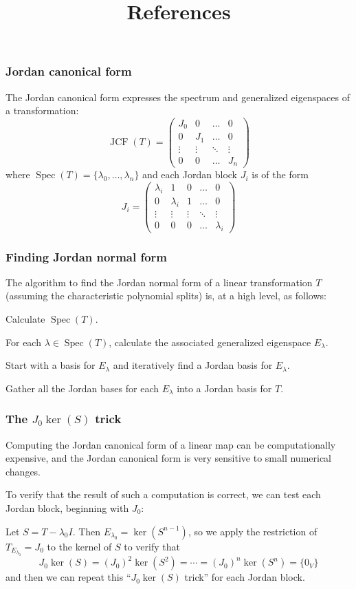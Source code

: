 \documentclass{beamer}
\DeclareMathOperator{\Spec}{Spec}
\theoremstyle{definition}
\begin{document}
\begin{frame}
    \frametitle{Jordan canonical form}
    The Jordan canonical form expresses the spectrum and generalized eigenspaces of a transformation:
    \[
        \operatorname{JCF}(T) = \begin{pmatrix}
            J_0 & 0 & \ldots & 0 \\
            0 & J_1 & \ldots & 0 \\
            \vdots & \vdots & \ddots & \vdots \\
            0 & 0 & \ldots & J_n
        \end{pmatrix}
    \]
    where $\Spec(T) = \{\lambda_0, \ldots, \lambda_n\}$ and each Jordan block $J_i$ is of the form
    \[
        J_i = \begin{pmatrix}
            \lambda_i & 1 & 0 & \ldots & 0 \\
            0 & \lambda_i & 1 & \ldots & 0 \\
            \vdots & \vdots & \vdots & \ddots & \vdots \\
            0 & 0 & 0 & \ldots & \lambda_i
        \end{pmatrix}
    \]
\end{frame}

\begin{frame}
    \frametitle{Finding Jordan normal form}

    The algorithm to find the Jordan normal form of a linear transformation $T$ (assuming the characteristic polynomial splits) is, at a high level, as follows:

    \pause
    Calculate $\Spec(T)$.

    \pause
    For each $\lambda \in \Spec(T)$, calculate the associated generalized eigenspace $E_\lambda$.

    \pause
    Start with a basis for $E_\lambda$ and iteratively find a Jordan basis for $E_\lambda$.

    \pause
    Gather all the Jordan bases for each $E_\lambda$ into a Jordan basis for $T$.
\end{frame}

\begin{frame}
    \frametitle{The $J_0 \ker(S)$ trick}
    
    Computing the Jordan canonical form of a linear map can be computationally expensive, and the Jordan canonical form is very sensitive
    to small numerical changes.

    \pause
    To verify that the result of such a computation is correct, we can test each Jordan block, beginning with $J_0$:

    \pause
    Let $S = T - \lambda_0 I$. Then $E_{\lambda_0} = \ker(S^{n-1})$, so we apply the restriction of $T_{E_{\lambda_0}} = J_0$ to the kernel of $S$
    to verify that
    \[
        J_0 \ker(S) = (J_0)^2 \ker(S^2) = \cdots = (J_0)^n \ker(S^n) = \{0_V\}
    \]
    and then we can repeat this ``$J_0 \ker(S)$ trick'' for each Jordan block.
\end{frame}

\begin{frame}
    \title{References}
    \printbibliography
\end{frame}
\end{document}
